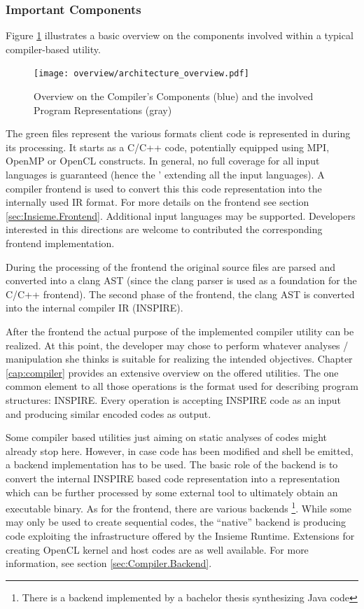 \subsubsection{Important Components}
Figure \ref{fig:Overview.Compiler.Components} illustrates a basic overview on
the components involved within a typical compiler-based utility. 
\begin{figure}[tb]
	\centering
	\texttt{[image: overview/architecture\_overview.pdf]}
	\caption{Overview on the Compiler's Components (blue) and the involved Program Representations (gray)}
	\label{fig:Overview.Compiler.Components}
\end{figure}
The green files represent the various formats client code is represented in
during its processing. It starts as a C/C++ code, potentially equipped using
MPI, OpenMP or OpenCL constructs. In general, no full coverage for all input
languages is guaranteed (hence the ' extending all the input languages). A
compiler frontend is used to convert this this code representation into the
internally used IR format. For more details on the frontend see section
\ref{sec:Insieme.Frontend}. Additional input languages may be supported.
Developers interested in this directions are welcome to contributed the
corresponding frontend implementation.

During the processing of the frontend the original source files are parsed and
converted into a clang AST (since the clang parser is used as a foundation for
the C/C++ frontend). The second phase of the frontend, the clang AST is
converted into the internal compiler IR (INSPIRE).

After the frontend the actual purpose of the implemented compiler utility can be
realized. At this point, the developer may chose to perform whatever analyses /
manipulation she thinks is suitable for realizing the intended objectives.
Chapter \ref{cap:compiler} provides an extensive overview on the offered
utilities. The one common element to all those operations is the format used for
describing program structures: INSPIRE. Every operation is accepting INSPIRE
code as an input and producing similar encoded codes as output.

Some compiler based utilities just aiming on static analyses of codes might
already stop here. However, in case code has been modified and shell be emitted,
a backend implementation has to be used. The basic role of the backend is to
convert the internal INSPIRE based code representation into a representation
which can be further processed by some external tool to ultimately obtain an
executable binary. As for the frontend, there are various backends
\footnote{There is a backend implemented by a bachelor thesis synthesizing Java
code}. While some may only be used to create sequential codes, the ``native''
backend is producing code exploiting the infrastructure offered by the Insieme
Runtime. Extensions for creating OpenCL kernel and host codes are as well
available. For more information, see section \ref{sec:Compiler.Backend}.

